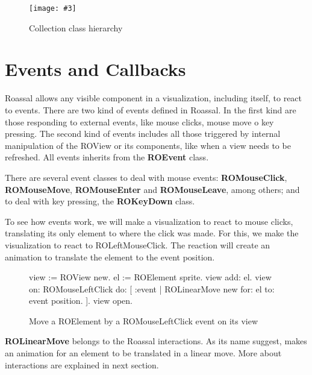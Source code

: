\documentclass[a4paper,10pt,twoside]{book}
\newcommand{\fig}[4]{
		\begin{figure}[#1]
			\centering
			\texttt{[image: \#3]}
			\caption{\label{fig:#3}#4}
		\end{figure}}
\begin{document}
\fig{H}{0.4}{collectionHierarchy}{Collection class hierarchy}


\section{Events and Callbacks}

Roassal allows any visible component in a visualization, including itself, to react to events. There are two kind of events defined in Roassal. In the first kind are those responding to external events, like mouse clicks, mouse move o key pressing. The second kind of events includes all those triggered by internal manipulation of the ROView or its components, like when a view needs to be refreshed.
All events inherits from the \textbf{ROEvent} class.

There are several event classes to deal with mouse events: \textbf{ROMouseClick}, \textbf{ROMouseMove}, \textbf{ROMouseEnter} and \textbf{ROMouseLeave}, among others; and to deal with key pressing, the \textbf{ROKeyDown} class.

To see how events work, we will make a visualization to react to mouse clicks, translating its only element to where the click was made. For this, we make the visualization to react to ROLeftMouseClick. The reaction will create an animation to translate the element to the event position.

\begin{figure}[H]
      \begin{minipage}[t]{0.61\textwidth}
      \vspace{0pt}
     \begin{code}{}
view := ROView new.
el := ROElement sprite.
view add: el.
view 
	on: ROMouseLeftClick 
	do: [ :event | 
		ROLinearMove new
			for: el to: event position.
	].
view open.
  \end{code}
   \end{minipage}
   \hfill
\caption{Move a ROElement by a ROMouseLeftClick event on its view }
\end{figure} 

\textbf{ROLinearMove} belongs to the Roassal interactions. As its name suggest, makes an animation for an element to be translated in a linear move. More about interactions are explained in next section.

%


\end{document}
